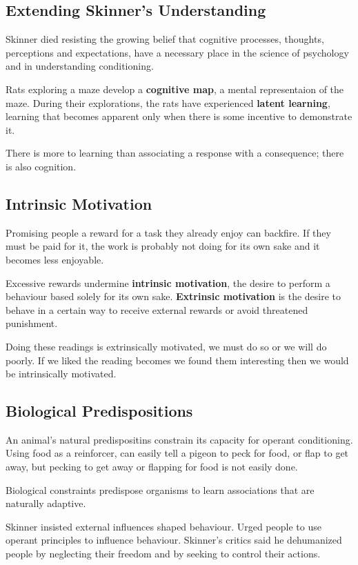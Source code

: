 \documentclass[12pt]{article}
\begin{document}
\subsection*{Extending Skinner's Understanding}
Skinner died resisting the growing belief that cognitive processes, thoughts, perceptions and expectations, have a necessary place in the science of psychology and in understanding conditioning. 

Rats exploring a maze develop a \textbf{cognitive map}, a mental representaion of the maze. During their explorations, the rats have experienced \textbf{latent learning}, learning that becomes apparent only when there is some incentive to demonstrate it. 

There is more to learning than associating a response with a consequence; there is also cognition. 

\subsection*{Intrinsic Motivation}
Promising people a reward for a task they already enjoy can backfire. If they must be paid for it, the work is probably not doing for its own sake and it becomes less enjoyable.

Excessive rewards undermine \textbf{intrinsic motivation}, the desire to perform a behaviour based solely for its own sake. \textbf{Extrinsic motivation} is the desire to behave in a certain way to receive external rewards or avoid threatened punishment.

Doing these readings is extrinsically motivated, we must do so or we will do poorly. If we liked the reading becomes we found them interesting then we would be intrinsically motivated. 

\subsection*{Biological Predispositions}
An animal's natural predispositins constrain its capacity for operant conditioning. Using food as a reinforcer, can easily tell a pigeon to peck for food, or flap to get away, but pecking to get away or flapping for food is not easily done.

Biological constraints predispose organisms to learn associations that are naturally adaptive.

Skinner insisted external influences shaped behaviour. Urged people to use operant principles to influence behaviour. Skinner's critics said he dehumanized people by neglecting their freedom and by seeking to control their actions.
\end{document}
